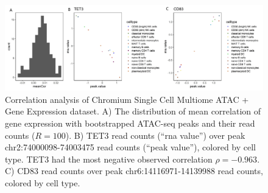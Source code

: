 \documentclass{article}
\begin{document}
\begin{figure}[htbp]
\centering
\includegraphics[scale=0.08]{Figures/sfig2.jpeg}
\caption{Correlation analysis of Chromium Single Cell
  Multiome ATAC + Gene Expression dataset. A) The distribution of mean
  correlation of gene expression with bootstrapped
  ATAC-seq peaks and their read counts ($R = 100$).
  B) TET3 read counts (``rna value'') over peak
  chr2:74000098-74003475 read counts (``peak value''),
  colored by cell type. TET3 had
  the most negative observed correlation $\rho = −0.963$.
  C) CD83 read
  counts over peak chr6:14116971-14139988 read counts, colored by cell
  type.  }
\label{fig:suppfig3}
\end{figure}


%
%
%
%
%
%
%

\end{document}
